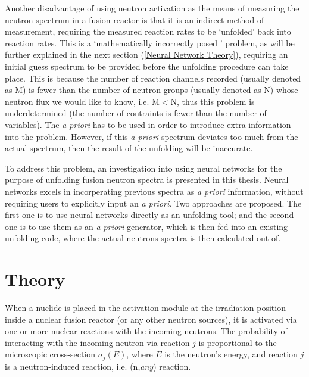 \documentclass[a4paper, 12pt]{article}
\begin{document}
Another disadvantage of using neutron activation as the means of measuring the neutron spectrum in a fusion reactor is that it is an indirect method of measurement, requiring the measured reaction rates to be `unfolded' back into reaction rates. This is a `mathematically incorrectly posed ' problem\cite{BirminghamUnfolding}, as will be further explained in the next section (\ref{Neural Network Theory}), requiring an initial guess spectrum to be provided before the unfolding procedure can take place. This is because the number of reaction channels recorded (usually denoted as M) is fewer than the number of neutron groups (usually denoted as N) whose neutron flux we would like to know, i.e. M$<$N, thus this problem is underdetermined (the number of contraints is fewer than the number of variables). The \emph{a priori} has to be used in order to introduce extra information into the problem. However, if this \emph{a priori} spectrum deviates too much from the actual spectrum, then the result of the unfolding will be inaccurate.

To address this problem, an investigation into using neural networks for the purpose of unfolding fusion neutron spectra is presented in this thesis.
Neural networks excels in incorperating previous spectra as \emph{a priori} information, without requiring users to explicitly input an \emph{a priori}.
Two approaches are proposed. The first one is to use neural networks directly as an unfolding tool; and the second one is to use them as an \emph{a priori} generator, which is then fed into an existing unfolding code, where the actual neutrons spectra is then calculated out of.

\section{Theory}
When a nuclide is placed in the activation module at the irradiation position inside a nuclear fusion reactor (or any other neutron sources), it is activated via one or more nuclear reactions with the incoming neutrons. The probability of interacting with the incoming neutron via reaction $j$ is proportional to the microscopic cross-section $\sigma_j (E)$, where $E$ is the neutron's energy, and reaction $j$ is a neutron-induced reaction, i.e. (n,\textit{any}) reaction.

\end{document}
